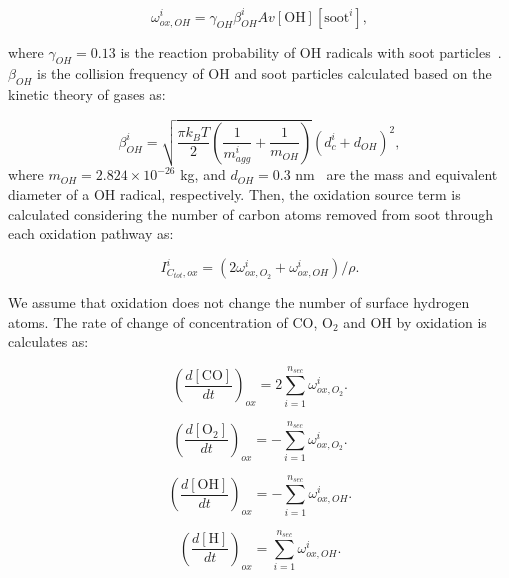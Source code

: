 \begin{equation}
	\omega^i_{ox,OH} = \gamma_{OH} \beta^i_{OH} Av [\mathrm{OH}][\mathrm{soot}^i],
	\label{eqn:hacaOHRate}
\end{equation}

\noindent where $\gamma_{OH}=0.13$ is the reaction probability of OH radicals with soot particles~\citep{appel2000kinetic}. $\beta_{OH}$ is the collision frequency of OH and soot particles calculated based on the kinetic theory of gases as:

\begin{equation}
	\beta^i_{OH} = 
	\sqrt{
		\frac{\pi k_B T}{2}\left(\frac{1}{m^i_{agg}}+\frac{1}{m_{OH}}\right)
	}
	\left(d^i_c+d_{OH}\right)^2,
	\label{eqn:betaOH}
\end{equation}
\noindent where $m_{OH}=2.824\times10^{-26}$ kg, and $d_{OH}=0.3$ nm~\citep{shepherd2022measurement} are the mass and equivalent diameter of a OH radical, respectively. Then, the oxidation source term is calculated considering the number of carbon atoms removed from soot through each oxidation pathway as:

\begin{equation}
	I^i_{C_{tot},ox} = (2\omega^i_{ox,O_2} + \omega^i_{ox,OH})/\rho
	\label{eqn:ICtot}.
\end{equation}

We assume that oxidation does not change the number of surface hydrogen atoms. The rate of change of concentration of CO, $\mathrm{O_2}$ and OH by oxidation is calculates as:

\begin{equation}
	\left(\frac{d\left[{\mathrm{CO}}\right]}{dt}\right)_{ox} = 2\sum_{i=1}^{n_{sec}}\omega^i_{ox,O_2}
	\label{eqn:COrate_ox}.
\end{equation}

\begin{equation}
	\left(\frac{d\left[{\mathrm{O_2}}\right]}{dt}\right)_{ox} = -\sum_{i=1}^{n_{sec}}\omega^i_{ox,O_2}
	\label{eqn:O2rate_ox}.
\end{equation}

\begin{equation}
	\left(\frac{d\left[{\mathrm{OH}}\right]}{dt}\right)_{ox} = -\sum_{i=1}^{n_{sec}}\omega^i_{ox,OH}
	\label{eqn:Hrate_ox}.
\end{equation}

\begin{equation}
	\left(\frac{d\left[{\mathrm{H}}\right]}{dt}\right)_{ox} = \sum_{i=1}^{n_{sec}}\omega^i_{ox,OH}
	\label{eqn:OHrate_ox}.
\end{equation}



